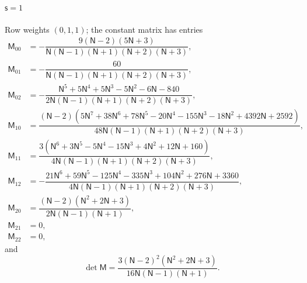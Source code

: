 \documentclass{amsart}
\theoremstyle{definition}
\theoremstyle{remark}
\numberwithin{equation}{section}
\begin{document}
\paragraph{$\mathsf s=1$} Row weights $(0,1,1)$; the constant matrix has entries
{\small\allowdisplaybreaks\begin{align*}
  \mathsf M_{00}&=-\dfrac{9(\mathsf N - 2)(5\mathsf N + 3)}{\mathsf N(\mathsf N - 1)(\mathsf N + 1)(\mathsf N + 2)(\mathsf N + 3)},\\
  \mathsf M_{01}&=-\dfrac{60}{\mathsf N(\mathsf N - 1)(\mathsf N + 1)(\mathsf N + 2)(\mathsf N + 3)},\\
  \mathsf M_{02}&=-\dfrac{\mathsf N^{5} + 5\mathsf N^{4} + 5\mathsf N^{3} - 5\mathsf N^{2} - 6\mathsf N - 840}{2\mathsf N(\mathsf N - 1)(\mathsf N + 1)(\mathsf N + 2)(\mathsf N + 3)},\\
  \mathsf M_{10}&=\dfrac{(\mathsf N - 2)(5\mathsf N^{7} + 38\mathsf N^{6} + 78\mathsf N^{5} - 20\mathsf N^{4} - 155\mathsf N^{3} - 18\mathsf N^{2} + 4392\mathsf N + 2592)}{48\mathsf N(\mathsf N - 1)(\mathsf N + 1)(\mathsf N + 2)(\mathsf N + 3)},\\
  \mathsf M_{11}&=\dfrac{3(\mathsf N^{6} + 3\mathsf N^{5} - 5\mathsf N^{4} - 15\mathsf N^{3} + 4\mathsf N^{2} + 12\mathsf N + 160)}{4\mathsf N(\mathsf N - 1)(\mathsf N + 1)(\mathsf N + 2)(\mathsf N + 3)},\\
  \mathsf M_{12}&=-\dfrac{21\mathsf N^{6} + 59\mathsf N^{5} - 125\mathsf N^{4} - 335\mathsf N^{3} + 104\mathsf N^{2} + 276\mathsf N + 3360}{4\mathsf N(\mathsf N - 1)(\mathsf N + 1)(\mathsf N + 2)(\mathsf N + 3)},\\
  \mathsf M_{20}&=\dfrac{(\mathsf N - 2)(\mathsf N^{2} + 2\mathsf N + 3)}{2\mathsf N(\mathsf N - 1)(\mathsf N + 1)},\\
  \mathsf M_{21}&=0,\\
  \mathsf M_{22}&=0,
\end{align*}}
and
\[\det\mathsf M=\frac{3(\mathsf N - 2)^{2}(\mathsf N^{2} + 2\mathsf N + 3)}{16\mathsf N(\mathsf N - 1)(\mathsf N + 1)}.\]
\end{document}

